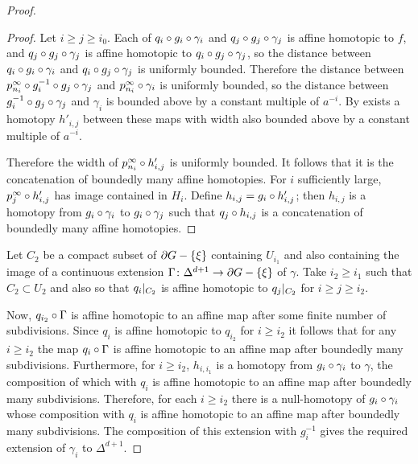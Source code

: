 \documentclass[a4paper]{article}
\begin{document}
\begin{proof}
\begin{proof} 
  Let $i\geq j\geq i_0$. Each of $q_i\circ g_i\circ\gamma_i$ and
  $q_j\circ g_j\circ\gamma_j$ is affine homotopic to $f$, and
  $q_j\circ g_j\circ\gamma_j$ is affine homotopic to $q_i\circ
  g_j\circ\gamma_j$, so the distance between $q_i\circ
  g_i\circ\gamma_i$ and $q_i\circ g_j\circ\gamma_j$ is uniformly
  bounded. Therefore the distance between $p^\infty_{n_i}\circ
  g_i^{-1}\circ g_j\circ\gamma_j$ and $p^\infty_{n_i}\circ \gamma_i$ is
  uniformly bounded, so the distance between $g_i^{-1}\circ
  g_j\circ\gamma_j$ and $\gamma_i$ is bounded above by a constant multiple
  of $a^{-i}$. By 
  exists a homotopy $h'_{i,j}$ between these maps with width also bounded above
  by a constant multiple of $a^{-i}$. 

  Therefore the width of $p^\infty_{n_i}\circ h'_{i,j}$ is uniformly bounded. 
  It follows that it is the concatenation of boundedly many affine homotopies. 
  For $i$ sufficiently large, $p^\infty_j\circ h'_{i,j}$ has image contained 
  in $H_i$. Define $h_{i,j} = g_i\circ h'_{i,j}$; then $h_{i,j}$ is a 
  homotopy from $g_i\circ\gamma_i$ to $g_i\circ\gamma_j$ such that 
  $q_j\circ h_{i,j}$ is a concatenation of boundedly many affine homotopies.
\end{proof}

Let $C_2$ be a compact subset of $\partial G - \left\{\xi\right\}$ containing $U_{i_1}$ and 
also containing the image of a continuous extension 
$\Gamma\colon\Delta^{d+1}\to\partial G - \left\{\xi\right\}$ of $\gamma$. Take $i_2\geq 
i_1$ such that $C_2 \subset U_2$ and also so that $q_i\vert_{C_2}$ is 
affine homotopic to $q_j\vert_{C_2}$ for $i \geq j \geq i_2$.

Now, $q_{i_2}\circ \Gamma$ is affine homotopic to an affine 
map after some finite number of subdivisions. Since $q_i$ is affine homotopic to 
$q_{i_2}$ for $i\geq i_2$ it follows that for any $i\geq i_2$ the map 
$q_i\circ \Gamma$ is affine homotopic to an affine map after boundedly many 
subdivisions. Furthermore, for $i\geq i_2$, $h_{i,i_1}$ is a 
homotopy from $g_i\circ \gamma_i$ to $\gamma$, the composition of which with 
$q_i$ is affine homotopic to an affine map after boundedly many subdivisions. 
Therefore, for each $i\geq i_2$ there is a null-homotopy of 
$g_i\circ\gamma_i$ whose composition with $q_i$ is affine homotopic to an 
affine map after boundedly many subdivisions. The composition of this extension 
with $g_i^{-1}$ gives the required extension of $\gamma_i$ to $\Delta^{d+1}$.
\end{proof} 
\end{document}
